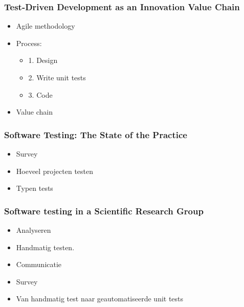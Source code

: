 \documentclass[10pt]{beamer}
\begin{document}
	\begin{frame}
		\frametitle{Test-Driven Development as an Innovation Value Chain}
		\begin{itemize}
			\item Agile methodology
			\item Process:
				\begin{itemize}
					\item 1. Design
					\item 2. Write unit tests
					\item 3. Code
				\end{itemize}
			\item Value chain
		\end{itemize}
	\end{frame}

	\begin{frame}
		\frametitle{Software Testing: The State of the Practice}
		\begin{itemize}
			\item Survey
			\item Hoeveel projecten testen
			\item Typen tests
		\end{itemize}
	\end{frame}	

	\begin{frame}
		\frametitle{Software testing in a Scientific Research Group}
		\begin{itemize}
			\item Analyseren 
			\item Handmatig testen.
			\item Communicatie
			\item Survey
			\item Van handmatig test naar geautomatiseerde unit tests
		\end{itemize} 
	\end{frame}
\end{document}
